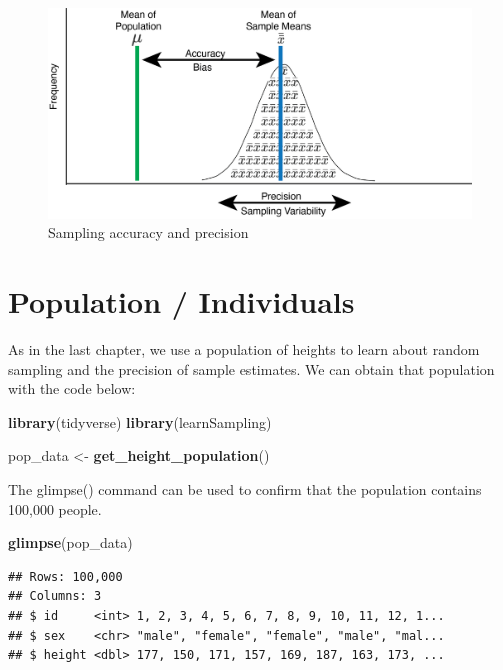 \documentclass[
]{krantz}
\makeatletter
\newenvironment{Shaded}{\begin{snugshade}}{\end{snugshade}}
\newcommand{\KeywordTok}[1]{\textcolor[rgb]{0.27,0.27,0.27}{\textbf{#1}}}
\newcommand{\NormalTok}[1]{#1}
\newcommand{\StringTok}[1]{\textcolor[rgb]{0.5,0.5,0.5}{#1}}
\newenvironment{kframe}{%
\medskip{}
\setlength{\fboxsep}{.8em}
 \def\at@end@of@kframe{}%
 \ifinner\ifhmode%
  \def\at@end@of@kframe{\end{minipage}}%
  \begin{minipage}{\columnwidth}%
 \fi\fi%
 \def\FrameCommand##1{\hskip\@totalleftmargin \hskip-\fboxsep
 \colorbox{shadecolor}{##1}\hskip-\fboxsep
     \hskip-\linewidth \hskip-\@totalleftmargin \hskip\columnwidth}%
 \MakeFramed {\advance\hsize-\width
   \@totalleftmargin\z@ \linewidth\hsize
   \@setminipage}}%
 {\par\unskip\endMakeFramed%
 \at@end@of@kframe}
\renewenvironment{Shaded}{\begin{kframe}}{\end{kframe}}
\makeatother
\begin{document}
\begin{figure}
\includegraphics[width=0.8\linewidth]{ch_samples_precision/images/sampling_accuracy} \caption{Sampling accuracy and precision}\label{fig:showbias2}
\end{figure}

\hypertarget{population-individuals}{%
\section{Population / Individuals}\label{population-individuals}}

As in the last chapter, we use a population of heights to learn about random sampling and the precision of sample estimates. We can obtain that population with the code below:

\begin{Shaded}
\begin{Highlighting}[]
\KeywordTok{library}\NormalTok{(tidyverse)}
\KeywordTok{library}\NormalTok{(learnSampling)}

\NormalTok{pop_data <-}\StringTok{ }\KeywordTok{get_height_population}\NormalTok{() }
\end{Highlighting}
\end{Shaded}

The glimpse() command can be used to confirm that the population contains 100,000 people.

\begin{Shaded}
\begin{Highlighting}[]
\KeywordTok{glimpse}\NormalTok{(pop_data)}
\end{Highlighting}
\end{Shaded}

\begin{verbatim}
## Rows: 100,000
## Columns: 3
## $ id     <int> 1, 2, 3, 4, 5, 6, 7, 8, 9, 10, 11, 12, 1...
## $ sex    <chr> "male", "female", "female", "male", "mal...
## $ height <dbl> 177, 150, 171, 157, 169, 187, 163, 173, ...
\end{verbatim}
\end{document}
